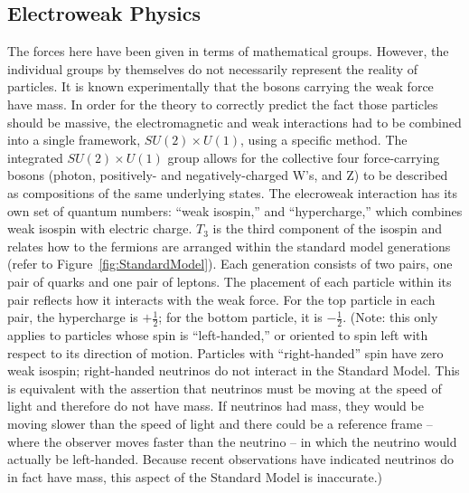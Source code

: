 \subsection{Electroweak Physics}
\label{theory:EWK}
The forces here have been given in terms 
of mathematical groups.  
However, the individual groups by themselves 
do not necessarily represent the reality of particles.  
It is known experimentally that the bosons carrying 
the weak force have mass.  
In order for the theory to correctly predict the 
fact those particles should be massive, 
the electromagnetic and weak interactions had to be combined 
into a single framework, 
$SU(2) \times U(1)$, using a specific method.  
The integrated $SU(2) \times U(1)$ group 
allows for the collective four force-carrying bosons 
(photon, positively- and negatively-charged W's, and Z) 
to be described as compositions of the same underlying states.  
The elecroweak interaction has its own set of quantum 
numbers: ``weak isospin,'' and ``hypercharge,'' 
which combines weak isospin with electric charge.  
$T_3$ is the third component of the isospin 
and relates how to the fermions are arranged 
within the standard model generations 
(refer to Figure~\ref{fig:StandardModel}).  
Each generation consists of two pairs, 
one pair of quarks and one pair of leptons.  
The placement of each particle within its pair 
reflects how it interacts with the weak force.  
For the top particle in each pair, the hypercharge 
is $+\frac{1}{2}$; 
for the bottom particle, it is $-\frac{1}{2}$.  
(Note: this only applies to particles whose spin 
is ``left-handed,'' 
or oriented to spin left with respect to its direction of motion.  
Particles with ``right-handed'' spin have zero weak isospin; 
right-handed neutrinos do not interact in the Standard Model.  
This is equivalent with the assertion that neutrinos 
must be moving at the speed of light and therefore 
do not have mass. 
If neutrinos had mass, 
they would be moving slower than the speed of light 
and there could be a reference frame -- 
where the observer moves faster than the neutrino -- 
in which the neutrino would actually be left-handed.  
Because recent observations have indicated neutrinos %
do in fact have mass, 
this aspect of the Standard Model is inaccurate.)  

